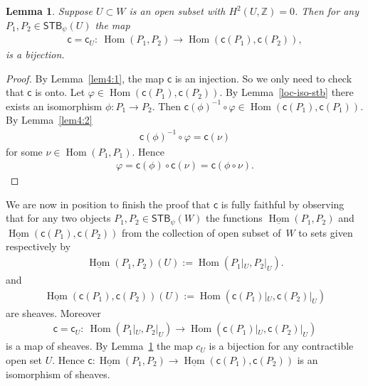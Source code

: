 \documentclass[10pt,a4paper]{amsart}
\numberwithin{equation}{section}
\newtheorem{Lemma}{Lemma}[section]
\begin{document}
\begin{Lemma}\label{lem4:3}
  Suppose $U\subset W$ is an open subset with $H^2(U,{\mathbb Z}) =0$.  Then for
    any $P_1, P_2 \in {\textsf{STB}}_\psi (U)$ the map
\begin{gather*}
{\textsf{c}}= {\textsf{c}}_U \colon \  \operatorname{Hom}(P_1, P_2) \to \operatorname{Hom}({\textsf{c}}(P_1) , {\textsf{c}}(P_2)),
\end{gather*}
is a bijection.
\end{Lemma}
\begin{proof}
By Lemma~\ref{lem4:1}, the map ${\textsf{c}}$ is an injection.
So we only need to check that ${\textsf{c}}$ is onto.
  Let $\varphi \in
  \operatorname{Hom}({\textsf{c}}(P_1), {\textsf{c}}(P_2))$.  By Lemma~\ref{loc-iso-stb} there exists an
  isomorphism $\phi\colon P_1\to P_2$.  Then ${\textsf{c}}(\phi)^{-1} \circ \varphi \in
  \operatorname{Hom}({\textsf{c}}(P_1), {\textsf{c}}(P_1))$. By Lemma~\ref{lem4:2}
\begin{gather*}
{\textsf{c}}(\phi)^{-1} \circ \varphi = {\textsf{c}} (\nu)
\end{gather*}
for some $\nu\in \operatorname{Hom}(P_1,P_1)$.  Hence
\begin{gather*}
\varphi = {\textsf{c}}(\phi)\circ {\textsf{c}} (\nu) = {\textsf{c}}(\phi\circ \nu).\tag*{\qed}
\end{gather*}
\renewcommand{\qed}{}
\end{proof}

We are now in position to f\/inish the proof that ${\textsf{c}}$ is fully faithful
by observing that for any two objects $P_1, P_2\in {\textsf{STB}}_\psi (W)$ the
functions $\underline{\operatorname{Hom}} (P_1, P_2)$ and $\underline{\operatorname{Hom}}
({\textsf{c}}(P_1), {\textsf{c}}(P_2))$ from the collection of open subset of~$W$ to sets
given respectively by
\begin{gather*}
\underline{\operatorname{Hom}} (P_1, P_2)(U):= \operatorname{Hom} (P_1|_U, P_2|_U).
\end{gather*}
and
\begin{gather*}
\underline{\operatorname{Hom}} ({\textsf{c}}(P_1), {\textsf{c}}(P_2))(U):= \operatorname{Hom} ({\textsf{c}}(P_1)|_U, {\textsf{c}}(P_2)|_U)
\end{gather*}
are sheaves.  Moreover
\begin{gather*}
{\textsf{c}} = {\textsf{c}}_U \colon \  \operatorname{Hom} (P_1|_U, P_2|_U) \to \operatorname{Hom} ({\textsf{c}}(P_1)|_U, {\textsf{c}}(P_2)|_U)
\end{gather*}
is a map of sheaves.  By Lemma~\ref{lem4:3} the map $c_U$ is a
bijection for any contractible open set $U$.  Hence ${\textsf{c}}\colon
\underline{\operatorname{Hom}} (P_1, P_2) \to \underline{\operatorname{Hom}} ({\textsf{c}}(P_1), {\textsf{c}}(P_2))$
is an isomorphism of sheaves.
\end{document}

